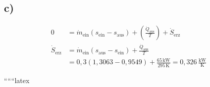 

\subsection*{c)}

\begin{align*}
0 &= \dot{m}_{\text{ein}} (s_{\text{ein}} - s_{\text{aus}}) + \left( \frac{\dot{Q}_{\text{aus}}}{T} \right) + \dot{S}_{\text{erz}} \\
\dot{S}_{\text{erz}} &= \dot{m}_{\text{ein}} (s_{\text{aus}} - s_{\text{ein}}) + \frac{\dot{Q}_{\text{aus}}}{T} \\
&= 0,3 \left( 1,3063 - 0,9549 \right) + \frac{65 \, \text{kW}}{295 \, \text{K}} = 0,326 \, \frac{\text{kW}}{\text{K}}
\end{align*}

``````latex